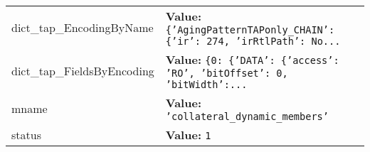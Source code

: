 \begin{longtable}{|p{\varnamewidth}|p{\vardescrwidth}|l}
\cline{1-2}
\raggedright d\-i\-c\-t\-\_\-t\-a\-p\-\_\-E\-n\-c\-o\-d\-i\-n\-g\-B\-y\-N\-a\-m\-e\- & \raggedright \textbf{Value:} 
{\tt \texttt{\{}\texttt{'}\texttt{AgingPatternTAPonly\_CHAIN}\texttt{'}\texttt{: }\texttt{\{}\texttt{'}\texttt{ir}\texttt{'}\texttt{: }274\texttt{, }\texttt{'}\texttt{irRtlPath}\texttt{'}\texttt{: }No\texttt{...}}&\\
\cline{1-2}
\raggedright d\-i\-c\-t\-\_\-t\-a\-p\-\_\-F\-i\-e\-l\-d\-s\-B\-y\-E\-n\-c\-o\-d\-i\-n\-g\- & \raggedright \textbf{Value:} 
{\tt \texttt{\{}0\texttt{: }\texttt{\{}\texttt{'}\texttt{DATA}\texttt{'}\texttt{: }\texttt{\{}\texttt{'}\texttt{access}\texttt{'}\texttt{: }\texttt{'}\texttt{RO}\texttt{'}\texttt{, }\texttt{'}\texttt{bitOffset}\texttt{'}\texttt{: }0\texttt{, }\texttt{'}\texttt{bitWidth}\texttt{'}\texttt{:}\texttt{...}}&\\
\cline{1-2}
\raggedright m\-n\-a\-m\-e\- & \raggedright \textbf{Value:} 
{\tt \texttt{'}\texttt{collateral\_dynamic\_members}\texttt{'}}&\\
\cline{1-2}
\raggedright s\-t\-a\-t\-u\-s\- & \raggedright \textbf{Value:} 
{\tt 1}&\\
\cline{1-2}
\end{longtable}

